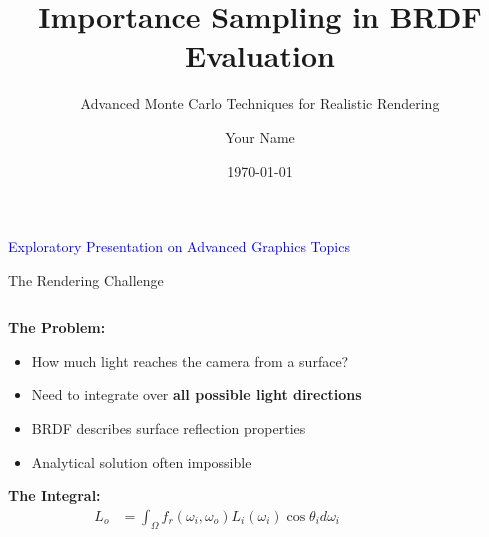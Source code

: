 \documentclass[aspectratio=169]{beamer}
\title{Importance Sampling in BRDF Evaluation}
\subtitle{Advanced Monte Carlo Techniques for Realistic Rendering}
\author{Your Name}
\institute{BUET CSE 409: Computer Graphics}
\date{\today}
\begin{document}
\begin{frame}
    \titlepage
    \begin{center}
        \vspace{0.5cm}
        \textcolor{blue}{\large Exploratory Presentation on Advanced Graphics Topics}
    \end{center}
\end{frame}

\begin{frame}{The Rendering Challenge}
    \begin{columns}
        \begin{column}{0.6\textwidth}
            \textbf{The Problem:}
            \begin{itemize}
                \item<1-> How much light reaches the camera from a surface?
                \item<2-> Need to integrate over \textbf{all possible light directions}
                \item<3-> BRDF describes surface reflection properties
                \item<4-> Analytical solution often impossible
            \end{itemize}
            
            \vspace{0.5cm}
            \textbf{The Integral:}
            \begin{align}
                L_o &= \int_{\Omega} f_r(\omega_i, \omega_o) L_i(\omega_i) \cos\theta_i d\omega_i
            \end{align}
        \end{column}
        \begin{column}{0.4\textwidth}
        \end{column}
    \end{columns}
\end{frame}
\end{document}
